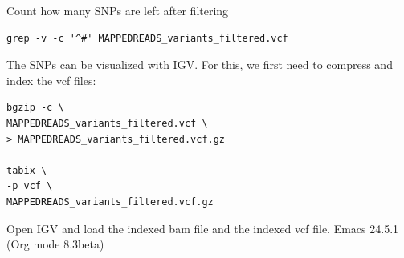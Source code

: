 \documentclass[11pt]{article}
\begin{document}
Count how many SNPs are left after filtering

\begin{verbatim}
grep -v -c '^#' MAPPEDREADS_variants_filtered.vcf
\end{verbatim}

The SNPs can be visualized with IGV. For this, we first need to
compress and index the vcf files: 

\begin{verbatim}
bgzip -c \
MAPPEDREADS_variants_filtered.vcf \
> MAPPEDREADS_variants_filtered.vcf.gz

tabix \
-p vcf \
MAPPEDREADS_variants_filtered.vcf.gz
\end{verbatim}

Open IGV and load the indexed bam file and the indexed vcf file.
Emacs 24.5.1 (Org mode 8.3beta)
\end{document}
